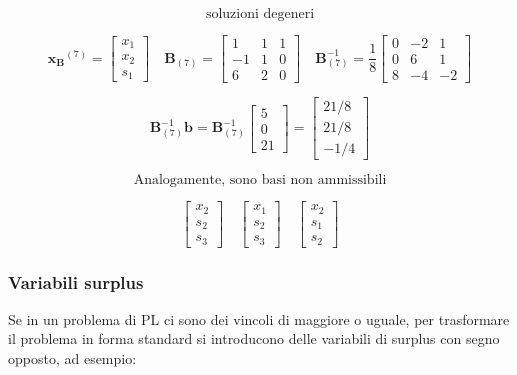 \documentclass[a4paper, 11pt]{article}
\begin{document}
        \[
            \text{soluzioni degeneri}
        \]


        \[
            \mathbf{x_B}^{(7)} = \begin{bmatrix} x_1 \\ x_2 \\ s_1 \end{bmatrix} \quad \mathbf{B}_{(7)} = \begin{bmatrix} 1 & 1 & 1 \\ -1 & 1 & 0 \\ 6 & 2 & 0 \end{bmatrix} \quad \mathbf{B}_{(7)}^{-1} = \frac{1}{8} \begin{bmatrix} 0 & -2 & 1 \\ 0 & 6 & 1 \\ 8 & -4 & -2 \end{bmatrix}
        \]


        \[
            \mathbf{B}_{(7)}^{-1} \mathbf{b} = \mathbf{B}_{(7)}^{-1} \begin{bmatrix} 5 \\ 0 \\ 21 \end{bmatrix} = \begin{bmatrix} 21/8 \\ 21/8 \\ -1/4 \end{bmatrix}
        \]


        \[
            \text{Analogamente, sono basi non ammissibili}
        \]    


        \[
            \begin{bmatrix} x_2 \\ s_2 \\ s_3 \end{bmatrix} \quad \begin{bmatrix} x_1 \\ s_2 \\ s_3 \end{bmatrix} \quad \begin{bmatrix} x_2 \\ s_1 \\ s_2 \end{bmatrix}
        \]

        
        \subsubsection{Variabili surplus}
        Se in un problema di PL ci sono dei vincoli di maggiore o uguale, per trasformare il problema in forma standard si introducono delle variabili di surplus con segno opposto, ad esempio:
\end{document}
